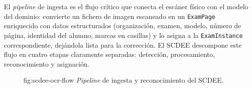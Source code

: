 El \textit{pipeline} de ingesta es el flujo crítico que conecta el escáner
físico con el modelo del dominio: convierte un fichero de imagen escaneado
en un \texttt{ExamPage} enriquecido con datos estructurados (organización,
examen, modelo, número de página, identidad del alumno, marcas en casillas)
y lo asigna a la \texttt{ExamInstance} correspondiente, dejándola lista
para la corrección. El SCDEE descompone este flujo en cuatro etapas
claramente separadas: detección, procesamiento, reconocimiento y asignación.

\begin{figure}[Pipeline de ingesta y reconocimiento]%
              {fig:scdee-ocr-flow}%
              {\textit{Pipeline} de ingesta y reconocimiento del SCDEE.}
\end{figure}
